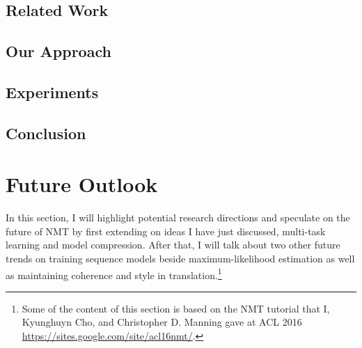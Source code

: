 \subsection{Related Work}
\label{subsec:related}



\subsection{Our Approach}
\label{subsec:approach}


\subsection{Experiments}
\label{subsec:exp}


\subsection{Conclusion}
\label{subsec:conclusion}


\section{Future Outlook}
\label{sec:outlook}
In this section, I will highlight potential research directions and speculate on the future of NMT by first extending on ideas I have just discussed, multi-task learning and model compression. After that, I will talk about two other future trends on training sequence models beside maximum-likelihood estimation as well as maintaining coherence and style in translation.\footnote{Some of the content of this section is based on the NMT tutorial that I, Kyunghuyn Cho, and Christopher D. Manning gave at ACL 2016 \url{https://sites.google.com/site/acl16nmt/}.}

